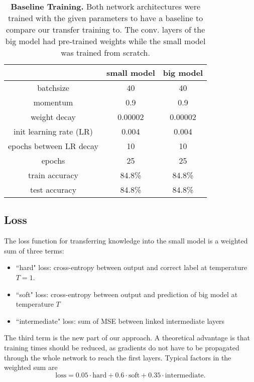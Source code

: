 \documentclass[10pt,twocolumn,letterpaper]{article}
\begin{document}
\begin{table}[]
	\begin{center}
	\begin{tabular}{|c|c|c|}
		\hline
								&	small model 	&	big model	\\ \hline
		batchsize					&	40			&	40		\\ \hline
		momentum				&	0.9			&	0.9		\\ \hline
		weight decay				&	0.00002		&	0.00002	\\ \hline
		init learning rate (LR)			&	0.004		&	0.004	\\ \hline
		epochs between LR decay 	&	10			&	10		\\ \hline
		epochs					&	25			&	25		\\ \hline
		train accuracy				&	84.8\%		&	84.8\%	\\ \hline
		test accuracy				&	84.8\%		&	84.8\%	\\ \hline
	\end{tabular}
	\end{center}
	\caption{\textbf{Baseline Training.} Both network architectures were trained with the given parameters to have a baseline to compare our transfer 	training to. The conv. layers of the big model had pre-trained weights while the small model was trained from scratch.}
	\label{tab:baseline_small_big}
\end{table}

\subsection{Loss}
The loss function for transferring knowledge into the small model is a weighted sum of three terms:
\begin{itemize}
	\item ``hard" loss: cross-entropy between output and correct label at temperature $T=1$.
	\item ``soft" loss: cross-entropy between output and prediction of big model at temperature $T$
	\item ``intermediate" loss: sum of MSE between linked intermediate layers
\end{itemize}
The third term is the new part of our approach. A theoretical advantage is that training times should be reduced, as gradients do not have to be propagated through the whole network to reach the first layers. Typical factors in the weighted sum are
\begin{equation}
	\text{loss} = 0.05 \cdot \text{hard} + 0.6 \cdot \text{soft} + 0.35 \cdot \text{intermediate}.
\end{equation}
\end{document}
